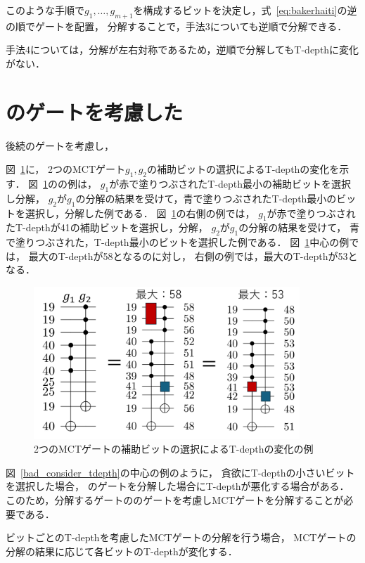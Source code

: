  このような手順で$g_{1},\dots ,g_{m+1}$を構成するビットを決定し，式~\ref{eq:bakerhaiti}の逆の順でゲートを配置，
 分解することで，手法3についても逆順で分解できる．
 \par
 手法4については，分解が左右対称であるため，逆順で分解してもT-depthに変化がない．
\section{のゲートを考慮した}
後続のゲートを考慮し，
\par
図~\ref{select_ancilla_tdepth}に，
2つのMCTゲート$g_{1}, g_{2}$の補助ビットの選択によるT-depthの変化を示す．
図~\ref{select_ancilla_tdepth}のの例は，
$g_{1}$が赤で塗りつぶされたT-depth最小の補助ビットを選択し分解，
$g_{2}$が$g_{1}$の分解の結果を受けて，青で塗りつぶされたT-depth最小のビットを選択し，分解した例である．
図~\ref{select_ancilla_tdepth}の右側の例では，
$g_{1}$が赤で塗りつぶされたT-depthが41の補助ビットを選択し，分解，
$g_{2}$が$g_{1}$の分解の結果を受けて，
青で塗りつぶされた，T-depth最小のビットを選択した例である．
図~\ref{select_ancilla_tdepth}中心の例では，
最大のT-depthが58となるのに対し，
右側の例では，最大のT-depthが53となる．
\begin{figure}[tbp]
  \centering
  \includegraphics[width=10cm]{img/select_ancilla_biit_tdepth.pdf}
  \caption{2つのMCTゲートの補助ビットの選択によるT-depthの変化の例}
  \label{select_ancilla_tdepth}
\end{figure}
図~\ref{bad_consider_tdepth}の中心の例のように，
貪欲にT-depthの小さいビットを選択した場合，
のゲートを分解した場合にT-depthが悪化する場合がある．
このため，分解するゲートののゲートを考慮しMCTゲートを分解することが必要である．
\par
ビットごとのT-depthを考慮したMCTゲートの分解を行う場合，
MCTゲートの分解の結果に応じて各ビットのT-depthが変化する．
